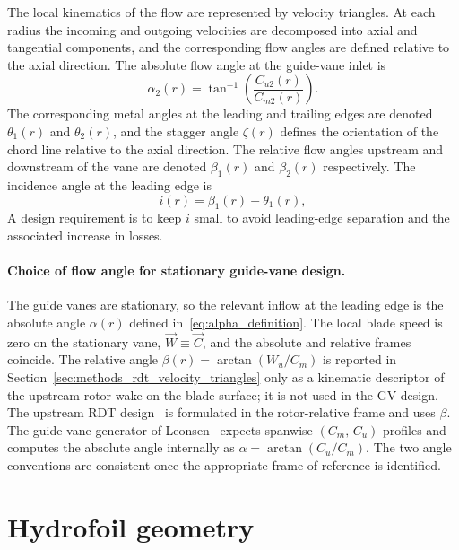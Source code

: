 The local kinematics of the flow are represented by velocity triangles. At each radius the incoming and outgoing velocities are decomposed into axial and tangential components, and the corresponding flow angles are defined relative to the axial direction. The absolute flow angle at the guide-vane inlet is
\begin{equation}
\alpha_2(r) = \tan^{-1}\!\left(\frac{C_{u2}(r)}{C_{m2}(r)}\right).
\label{eq:alpha_inlet}
\end{equation}
The corresponding metal angles at the leading and trailing edges are denoted $\theta_1(r)$ and $\theta_2(r)$, and the stagger angle $\zeta(r)$ defines the orientation of the chord line relative to the axial direction. The relative flow angles upstream and downstream of the vane are denoted $\beta_1(r)$ and $\beta_2(r)$ respectively. The incidence angle at the leading edge is
\begin{equation}
i(r) = \beta_1(r) - \theta_1(r),
\label{eq:incidence}
\end{equation}
A design requirement is to keep $i$ small to avoid leading-edge separation and the associated increase in losses.

\paragraph{Choice of flow angle for stationary guide-vane design.}
The guide vanes are stationary, so the relevant inflow at the leading edge is the absolute angle $\alpha(r)$ defined in~\eqref{eq:alpha_definition}. The local blade speed is zero on the stationary vane, $\vec{W}\equiv \vec{C}$, and the absolute and relative frames coincide. The relative angle $\beta(r)=\arctan(W_u/C_m)$ is reported in Section~\ref{sec:methods_rdt_velocity_triangles} only as a kinematic descriptor of the upstream rotor wake on the blade surface; it is not used in the GV design. The upstream RDT design~\cite{DjupeslandTrivedi2025} is formulated in the rotor-relative frame and uses $\beta$. The guide-vane generator of Leonsen~\cite{Leonsen2025} expects spanwise $(C_m,\,C_u)$ profiles and computes the absolute angle internally as $\alpha = \arctan(C_u/C_m)$. The two angle conventions are consistent once the appropriate frame of reference is identified.

\section{Hydrofoil geometry}
\label{sec:theory_airfoil}
 
